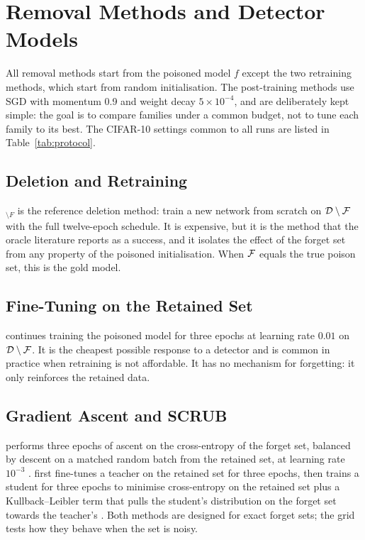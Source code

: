 \section{Removal Methods and Detector Models}
\label{sec:methods}

All removal methods start from the poisoned model $f$ except the two retraining
methods, which start from random initialisation. The post-training methods use
SGD with momentum 0.9 and weight decay $5\times10^{-4}$, and are deliberately
kept simple: the goal is to compare families under a common budget, not to tune
each family to its best. The CIFAR-10 settings common to all runs are listed in
Table~\ref{tab:protocol}.

\subsection{Deletion and Retraining}
$_{\setminus F}$ is the reference deletion method: train a new
network from scratch on $\mathcal{D}\setminus\mathcal{F}$ with the full twelve-epoch
schedule. It is expensive, but it is the method that the oracle literature
reports as a success, and it isolates the effect of the forget set from any
property of the poisoned initialisation. When $\mathcal{F}$ equals the true poison
set, this is the gold model.

\subsection{Fine-Tuning on the Retained Set}
 continues training the poisoned model for three epochs at
learning rate $0.01$ on $\mathcal{D}\setminus\mathcal{F}$. It is the cheapest possible
response to a detector and is common in practice when retraining is not
affordable. It has no mechanism for forgetting: it only reinforces the retained
data.

\subsection{Gradient Ascent and SCRUB}
 performs three epochs of ascent on the cross-entropy of the
forget set, balanced by descent on a matched random batch from the retained set,
at learning rate $10^{-3}$ \cite{amnesiac}.  first fine-tunes a
teacher on the retained set for three epochs, then trains a student for three
epochs to minimise cross-entropy on the retained set plus a Kullback--Leibler
term that pulls the student's distribution on the forget set towards the
teacher's \cite{scrub}. Both methods are designed for exact forget sets; the
grid tests how they behave when the set is noisy.

